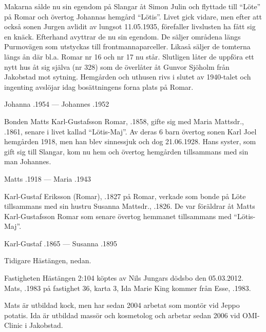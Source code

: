 
Makarna sålde nu sin egendom på Slangar åt Simon Julin och flyttade till ``Löte'' på Romar och övertog Johannas hemgård  ``Lötis''. Livet gick vidare, men efter att också sonen Jurgen avlidit av lungsot 11.05.1935, förefaller livslusten ha fått sig en knäck. Efterhand avyttrar de nu sin egendom. De säljer områdena  längs Purmovägen som utstyckas till frontmannaparceller. Likaså säljer de tomterna längs ån där bl.a.  Romar nr 16 och nr 17 nu står. Slutligen låter de uppföra ett nytt hus åt sig själva (nr 328) som de överlåter åt Gunvor Sjöholm från Jakobstad mot sytning. Hemgården och uthusen rivs i slutet av 1940-talet och ingenting avslöjar idag bosättningens forna plats på Romar.

Johanna .1954  ---  Johannes .1952


Bonden Matts Karl-Gustafsson Romar, .1858, gifte sig med Maria Mattsdr., .1861, senare i livet kallad ``Lötis-Maj''. Av deras 6 barn övertog sonen Karl Joel hemgården 1918, men han blev sinnessjuk och dog 21.06.1928. Hans syster, som gift sig till Slangar, kom nu hem och övertog hemgården tillsammans med sin man Johannes.

Matts .1918  ---  Maria .1943


Karl-Gustaf Eriksson (Romar), .1827 på Romar, verkade som bonde på Löte tillsammans med sin hustru Susanna Mattsdr., .1826. De var föräldrar åt Matts Karl-Gustafsson Romar som senare övertog hemmanet tillsammans med ``Lötis-Maj''.

Karl-Gustaf .1865  ---  Susanna .1895



Tidigare Hästängen, nedan.



Fastigheten Hästängen 2:104 köptes av Nils Jungars dödsbo den 05.03.2012. Mats, .1983 på fastighet 36, karta 3, Ida Marie King kommer från Esse, .1983.

Mats är utbildad kock, men har sedan 2004 arbetat som montör vid Jeppo potatis. Ida är utbildad massör och kosmetolog och arbetar sedan 2006 vid OMI-Clinic i Jakobstad.
\begin{jhchildren}
  \item {}
  \item {}
  \item {}
\end{jhchildren}

